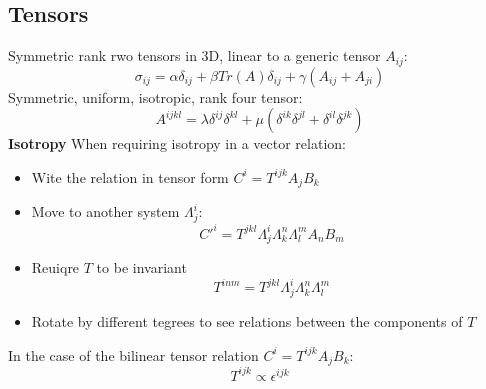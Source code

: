 \documentclass[twocolumn]{article}
\begin{document}
\subsection{Tensors}
Symmetric rank rwo tensors in 3D, linear to a generic tensor $A_{ij}$:
\begin{equation}
    \sigma_{ij} = \alpha \delta_{ij} + \beta Tr(A)\delta_{ij} + \gamma (A_{ij} + A_{ji})
\end{equation}
Symmetric, uniform, isotropic, rank four tensor:
\begin{equation}
    A^{ijkl} = \lambda\delta^{ij}\delta^{kl} + \mu\left(\delta^{ik}\delta^{jl} + \delta^{il}\delta^{jk}\right)
\end{equation} 
\newline
\textbf{Isotropy}
When requiring isotropy in a vector relation:
\begin{itemize}
    \item Wite the relation in tensor form $C^{i} = T^{ijk}A_jB_k$
    \item Move to another system $\Lambda^i_j$:
    \begin{equation}
        C'^{i} = T^{jkl}\Lambda^i_j \Lambda^n_k \Lambda^m_l A_nB_m
    \end{equation}
    \item Reuiqre $T$ to be invariant
    \begin{equation}
        T^{inm} = T^{jkl}\Lambda^i_j \Lambda^n_k \Lambda^m_l
    \end{equation}
    \item Rotate by different tegrees to see relations between the components of $T$
\end{itemize}
In the case of the bilinear tensor relation $C^{i} = T^{ijk}A_jB_k$:
\begin{equation}
    T^{ijk} \propto \epsilon^{ijk}
\end{equation}
\end{document}
